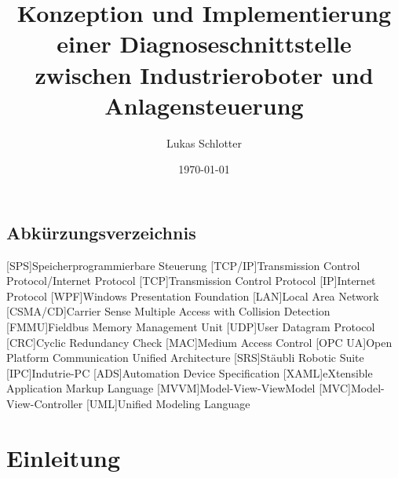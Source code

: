 \documentclass[ a4paper,
                oneside,
                toc=bibliography,
                toc=listof
                ]{scrbook}
\author{Lukas Schlotter}
\title{Konzeption und Implementierung einer Diagnoseschnittstelle zwischen Industrieroboter und Anlagensteuerung}
\date{\today}
\begin{document}
 
    \frontmatter
    \makeISWtitle
    
    \cleardoublepage
	\setcounter{page}{1} %

    
    \cleardoublepage
    \tableofcontents
    
  
    \section*{Abkürzungsverzeichnis}
    \begin{acronym}[CSMA/CD]
    	[SPS]{Speicherprogrammierbare Steuerung}
    	[TCP/IP]{Transmission Control Protocol/Internet Protocol}
    	[TCP]{Transmission Control Protocol}
    	[IP]{Internet Protocol}
    	[WPF]{Windows Presentation Foundation}
    	[LAN]{Local Area Network}
    	[CSMA/CD]{Carrier Sense Multiple Access with Collision Detection}
    	[FMMU]{Fieldbus Memory Management Unit}
    	[UDP]{User Datagram Protocol}
    	[CRC]{Cyclic Redundancy Check}
    	[MAC]{Medium Access Control}
    	[OPC UA]{Open Platform Communication Unified Architecture}
    	[SRS]{Stäubli Robotic Suite}
    	[IPC]{Indutrie-PC}
    	[ADS]{Automation Device Specification}
    	[XAML]{eXtensible Application Markup Language}
    	[MVVM]{Model-View-ViewModel}
    	[MVC]{Model-View-Controller}
    	[UML]{Unified Modeling Language}
    	
    \end{acronym}

    \mainmatter
    
    \chapter{Einleitung}
\end{document}
